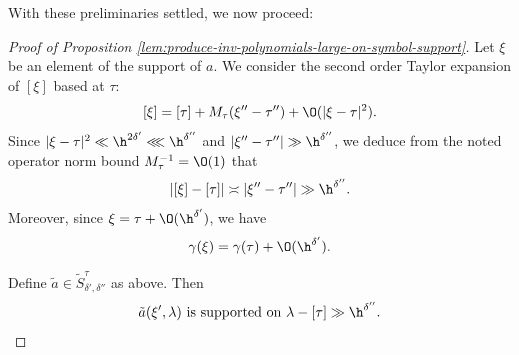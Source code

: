 With these preliminaries settled, we now proceed:
\begin{proof}[Proof of Proposition \ref{lem:produce-inv-polynomials-large-on-symbol-support}]
  Let $\xi$ be an element of the support of $a$.  We consider the second order Taylor expansion of $[\xi]$ based at $\tau$: %
  \[
    [\xi] = [\tau] + M_\tau (\xi '' - \tau '') + \O(|\xi - \tau |^2).
  \]
  Since $|\xi - \tau |^2 \ll \h^{2 \delta '} \lll \h^{\delta ''}$ and $|\xi '' - \tau ''| \gg \h^{\delta ''}$, we deduce from the noted operator norm bound $M_\tau^{-1} = \O(1)$ that
  \[
    |[\xi] - [\tau]| \asymp |\xi '' - \tau ''| \gg \h^{ \delta ''}.
  \]
  Moreover, since $\xi = \tau + \O(\h^{\delta '})$, we have
  \[
    \gamma(\xi) = \gamma(\tau) + \O(\h^{\delta '}).
  \]

  Define \(\tilde{a} \in \tilde{S}^{\tau}_{\delta ', \delta ''}\) as above.  Then
  \begin{equation}\label{eq:cuhn9dsj1l}
    \text{\(\tilde{a}(\xi ', \lambda)\) is supported on \(\lambda - [\tau] \gg \h^{ \delta ''}\)}.
  \end{equation}


\end{proof}
